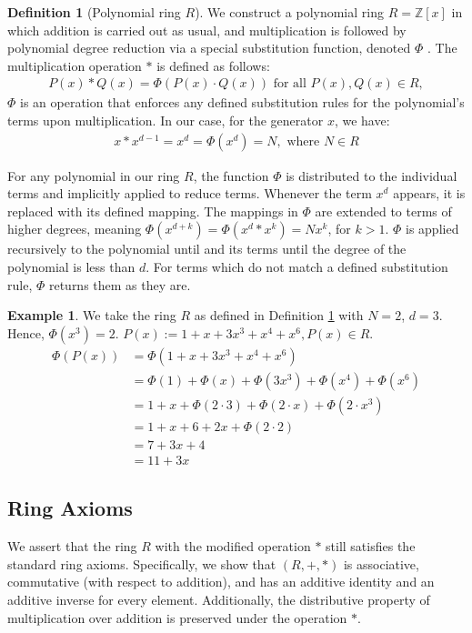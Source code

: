 \documentclass{article}
\theoremstyle{plain}
\theoremstyle{definition}
\newtheorem{definition}{Definition}
\newtheorem{example}{Example}
\newcommand{\redu}{\Phi}
\begin{document}
\begin{definition}[Polynomial ring $R$] \label{definition:ring}
We construct a polynomial ring \(R = \mathbb{Z}[x]\) in which addition is carried out as usual, and multiplication is followed by polynomial degree reduction via a special substitution function, denoted $\redu$ \cite{shunia2023polynomial}. The multiplication operation \(\ast\) is defined as follows:
\begin{align}
P(x) \ast Q(x) = \redu(P(x) \cdot Q(x)) \text{ for all } P(x), Q(x) \in R,
\end{align}
\(\redu\) is an operation that enforces any defined substitution rules for the polynomial's terms upon multiplication. In our case, for the generator \(x\), we have:
\begin{align}
x \ast x^{d-1} = x^d = \redu(x^d) = N, \text{ where } N \in R
\end{align}

For any polynomial in our ring $R$, the function \( \redu \) is distributed to the individual terms and implicitly applied to reduce terms. Whenever the term $x^d$ appears, it is replaced with its defined mapping. The mappings in $\redu$ are extended to terms of higher degrees, meaning $\redu(x^{d+k}) = \redu(x^d \ast x^k) = N x^k$, for $k > 1$. $\redu$ is applied recursively to the polynomial until and its terms until the degree of the polynomial is less than $d$. For terms which do not match a defined substitution rule, $\redu$ returns them as they are.
\end{definition}

\begin{example}
We take the ring $R$ as defined in Definition \ref{definition:ring} with $N = 2$, $d = 3$. Hence, $\redu(x^3) = 2$. $P(x) := 1 + x + 3x^3 + x^{4} + x^{6}, P(x) \in R$.
\begin{align}
    \redu(P(x)) &= \redu(1 + x + 3x^3 + x^{4} + x^{6}) \\
    &= \redu(1) + \redu(x) + \redu(3x^3) + \redu(x^{4}) + \redu(x^{6}) \\
    &= 1 + x + \redu(2 \cdot 3) + \redu(2 \cdot x) + \redu(2 \cdot x^3) \\
    &= 1 + x + 6 + 2x + \redu(2 \cdot 2) \\
    &= 7 + 3x + 4 \\
    &= 11 + 3x
\end{align}
\end{example}

\subsection{Ring Axioms}
We assert that the ring \( R \) with the modified operation \(\ast\) still satisfies the standard ring axioms. Specifically, we show that \((R, +, \ast)\) is associative, commutative (with respect to addition), and has an additive identity and an additive inverse for every element. Additionally, the distributive property of multiplication over addition is preserved under the operation \(\ast\).
\end{document}
